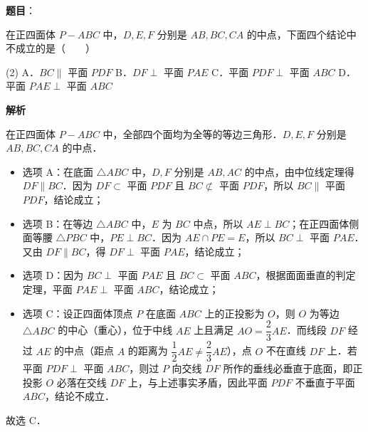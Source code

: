 \begin{answer}

\textbf{题目}：

在正四面体 $P - ABC$ 中，$D, E, F$ 分别是 $AB, BC, CA$ 的中点，下面四个结论中不成立的是\mbox{（　　）}

\begin{gkopts}(2)
\task A．$BC \parallel$ 平面 $PDF$
\task B．$DF \perp$ 平面 $PAE$
\task C．平面 $PDF \perp$ 平面 $ABC$
\task D．平面 $PAE \perp$ 平面 $ABC$
\end{gkopts}

\textbf{解析}

在正四面体 $P - ABC$ 中，全部四个面均为全等的等边三角形．$D, E, F$ 分别是 $AB, BC, CA$ 的中点．
\begin{itemize}
\item 选项 A：在底面 $\triangle ABC$ 中，$D, F$ 分别是 $AB, AC$ 的中点，由中位线定理得 $DF \parallel BC$．因为 $DF \subset$ 平面 $PDF$ 且 $BC \not\subset$ 平面 $PDF$，所以 $BC \parallel$ 平面 $PDF$，结论成立；
\item 选项 B：在等边 $\triangle ABC$ 中，$E$ 为 $BC$ 中点，所以 $AE \perp BC$；在正四面体侧面等腰 $\triangle PBC$ 中，$PE \perp BC$．因为 $AE \cap PE = E$，所以 $BC \perp$ 平面 $PAE$．又由 $DF \parallel BC$，得 $DF \perp$ 平面 $PAE$，结论成立；
\item 选项 D：因为 $BC \perp$ 平面 $PAE$ 且 $BC \subset$ 平面 $ABC$，根据面面垂直的判定定理，平面 $PAE \perp$ 平面 $ABC$，结论成立；
\item 选项 C：设正四面体顶点 $P$ 在底面 $ABC$ 上的正投影为 $O$，则 $O$ 为等边 $\triangle ABC$ 的中心（重心），位于中线 $AE$ 上且满足 $AO = \dfrac{2}{3}AE$．而线段 $DF$ 经过 $AE$ 的中点（距点 $A$ 的距离为 $\dfrac{1}{2}AE \neq \dfrac{2}{3}AE$），点 $O$ 不在直线 $DF$ 上．若平面 $PDF \perp$ 平面 $ABC$，则过 $P$ 向交线 $DF$ 所作的垂线必垂直于底面，即正投影 $O$ 必落在交线 $DF$ 上，与上述事实矛盾，因此平面 $PDF$ 不垂直于平面 $ABC$，结论不成立．
\end{itemize}

故选 C．


\end{answer}

